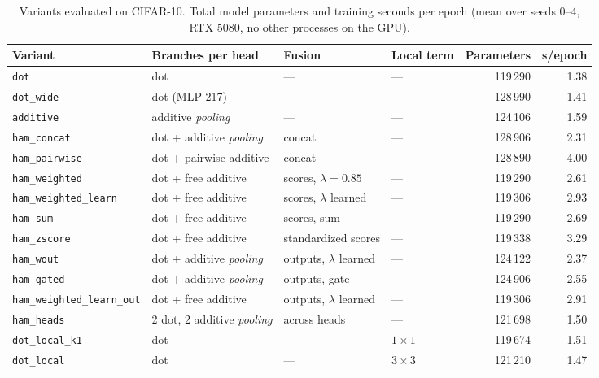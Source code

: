 
\begin{table}[!t]
\centering
\footnotesize
\caption{Variants evaluated on CIFAR-10. Total model parameters and training seconds per epoch (mean over seeds 0--4, RTX 5080, no other processes on the GPU).}
\label{tab:variantes}
\begin{adjustbox}{max width=\linewidth}
\begin{tabular}{llllrr}
\toprule
Variant & Branches per head & Fusion & Local term & Parameters & s/epoch \\
\midrule
\texttt{dot} & dot & --- & --- & 119\,290 & 1.38 \\
\texttt{dot\_wide} & dot (MLP 217) & --- & --- & 128\,990 & 1.41 \\
\texttt{additive} & additive \emph{pooling} & --- & --- & 124\,106 & 1.59 \\
\midrule
\texttt{ham\_concat} & dot + additive \emph{pooling} & concat & --- & 128\,906 & 2.31 \\
\texttt{ham\_pairwise} & dot + pairwise additive & concat & --- & 128\,890 & 4.00 \\
\texttt{ham\_weighted} & dot + free additive & scores, $\lambda=0.85$ & --- & 119\,290 & 2.61 \\
\texttt{ham\_weighted\_learn} & dot + free additive & scores, $\lambda$ learned & --- & 119\,306 & 2.93 \\
\texttt{ham\_sum} & dot + free additive & scores, sum & --- & 119\,290 & 2.69 \\
\texttt{ham\_zscore} & dot + free additive & standardized scores & --- & 119\,338 & 3.29 \\
\texttt{ham\_wout} & dot + additive \emph{pooling} & outputs, $\lambda$ learned & --- & 124\,122 & 2.37 \\
\texttt{ham\_gated} & dot + additive \emph{pooling} & outputs, gate & --- & 124\,906 & 2.55 \\
\texttt{ham\_weighted\_learn\_out} & dot + free additive & outputs, $\lambda$ learned & --- & 119\,306 & 2.91 \\
\texttt{ham\_heads} & 2 dot, 2 additive \emph{pooling} & across heads & --- & 121\,698 & 1.50 \\
\midrule
\texttt{dot\_local\_k1} & dot & --- & $1\times1$ & 119\,674 & 1.51 \\
\texttt{dot\_local} & dot & --- & $3\times3$ & 121\,210 & 1.47 \\

\end{tabular}
\end{adjustbox}
\end{table}

